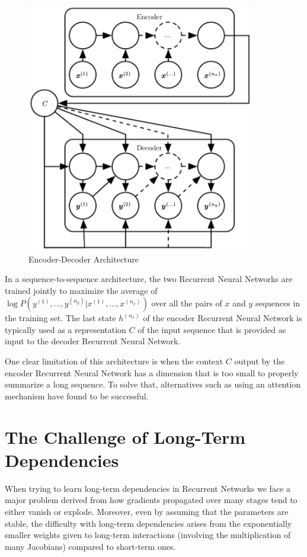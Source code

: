 \begin{figure}[h]
    \centering
    \includegraphics[width=10cm]{Images/encoder-decoder.png}
    \caption{Encoder-Decoder Architecture}
\end{figure}

\noindent In a sequence-to-sequence architecture, the two Recurrent Neural Networks are trained jointly to maximize the average of $\log P \left( y^{(1)}, ..., y^{(n_y)} | x^{(1)}, ..., x^{(n_x)}  \right) $ over all the pairs of $x$ and $y$ sequences in the training set. The last state $h^{(n_x)}$ of the encoder Recurrent Neural Network is typically used as a representation $C$ of the input sequence that is provided as input to the decoder Recurrent Neural Network.

\noindent One clear limitation of this architecture is when the context $C$ output by the encoder Recurrent Neural Network has a dimension that is too small to properly summarize a long sequence. To solve that, alternatives such as using an attention mechanism have found to be successful.

\newpage
\section{The Challenge of Long-Term Dependencies}

When trying to learn long-term dependencies in Recurrent Networks we face a major problem derived from how gradients propagated over many stages tend to either vanish or explode. Moreover, even by assuming that the parameters are stable, the diﬃculty with long-term dependencies arises from the exponentially smaller weights given to long-term interactions (involving the multiplication of many Jacobians) compared to short-term ones. 


